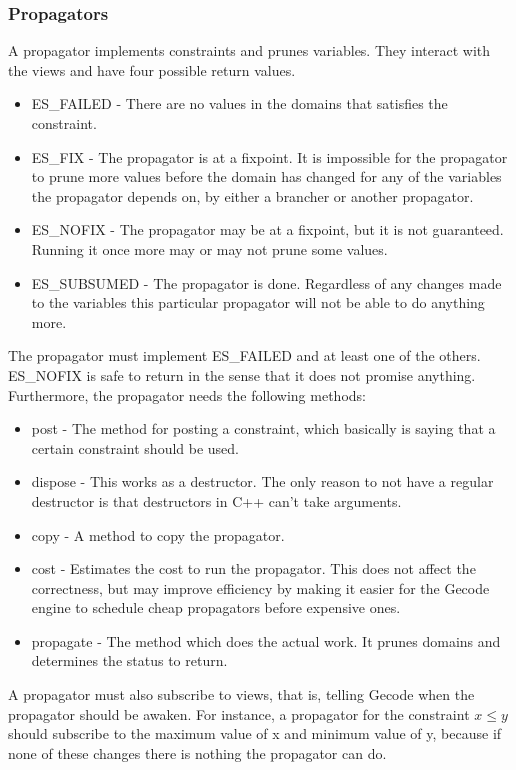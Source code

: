 \documentclass[a4paper,11pt]{article}
\begin{document}
\subsubsection{Propagators}
A propagator implements constraints and prunes variables. They interact with the views and have four possible return values.
\begin{itemize}
\item{ES\_FAILED} - There are no values in the domains that satisfies the constraint. 
\item{ES\_FIX} - The propagator is at a fixpoint. It is impossible for the propagator to prune more values before the domain has changed for any of the variables the propagator depends on, by either a brancher or another propagator.
\item{ES\_NOFIX} - The propagator may be at a fixpoint, but it is not guaranteed. Running it once more may or may not prune some values. 
\item{ES\_SUBSUMED} - The propagator is done. Regardless of any changes made to the variables this particular propagator will not be able to do anything more.
\end{itemize}
The propagator must implement ES\_FAILED and at least one of the others. ES\_NOFIX is safe to return in the sense that it does not promise anything. Furthermore, the propagator needs the following methods:
\begin{itemize}
\item{post} - The method for posting a constraint, which basically is saying that a certain constraint should be used.
\item{dispose} - This works as a destructor. The only reason to not have a regular destructor is that destructors in C++ can't take arguments.
\item{copy} - A method to copy the propagator.
\item{cost} - Estimates the cost to run the propagator. This does not affect the correctness, but may improve efficiency by making it easier for the Gecode engine to schedule cheap propagators before expensive ones.
\item{propagate} - The method which does the actual work. It prunes domains and determines the status to return.
\end{itemize}
A propagator must also subscribe to views, that is, telling Gecode when the propagator should be awaken. For instance, a propagator for the constraint $x\le y$ should subscribe to the maximum value of x and minimum value of y, because if none of these changes there is nothing the propagator can do.
\end{document}
